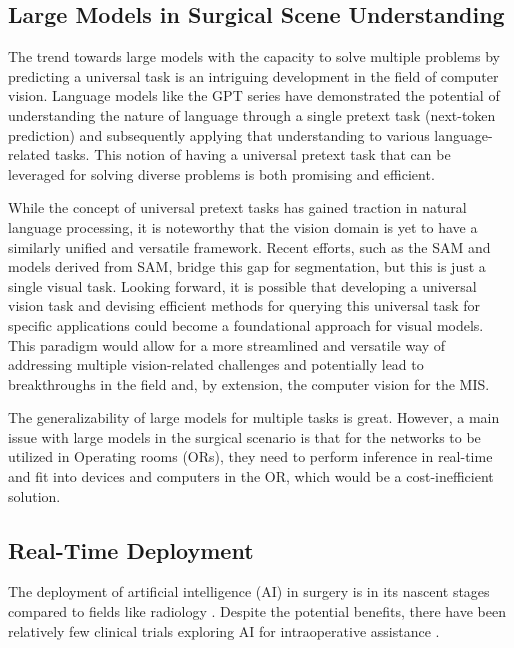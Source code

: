 \subsection{Large Models in Surgical Scene Understanding}
The trend towards large models with the capacity to solve multiple problems by predicting a universal task is an intriguing development in the field of computer vision. Language models like the GPT series \citep{radford2019language}  have demonstrated the potential of understanding the nature of language through a single pretext task (next-token prediction) and subsequently applying that understanding to various language-related tasks. This notion of having a universal pretext task that can be leveraged for solving diverse problems is both promising and efficient.

While the concept of universal pretext tasks has gained traction in natural language processing, it is noteworthy that the vision domain is yet to have a similarly unified and versatile framework. Recent efforts, such as the SAM \citep{kirillov2023segment} and models derived from SAM, bridge this gap for segmentation, but this is just a single visual task. Looking forward, it is possible that developing a universal vision task and devising efficient methods for querying this universal task for specific applications could become a foundational approach for visual models. This paradigm would allow for a more streamlined and versatile way of addressing multiple vision-related challenges and potentially lead to breakthroughs in the field and, by extension, the computer vision for the MIS.

The generalizability of large models for multiple tasks is great. However, a main issue with large models in the surgical scenario is that for the networks to be utilized in Operating rooms (ORs), they need to perform inference in real-time and fit into devices and computers in the OR, which would be a cost-inefficient solution.

\subsection{Real-Time Deployment}
The deployment of artificial intelligence (AI) in surgery is in its nascent stages compared to fields like radiology \citep{maier2022surgical}. Despite the potential benefits, there have been relatively few clinical trials exploring AI for intraoperative assistance \citep{varghese2024artificial,auloge2020augmented,mascagni2024early}.

